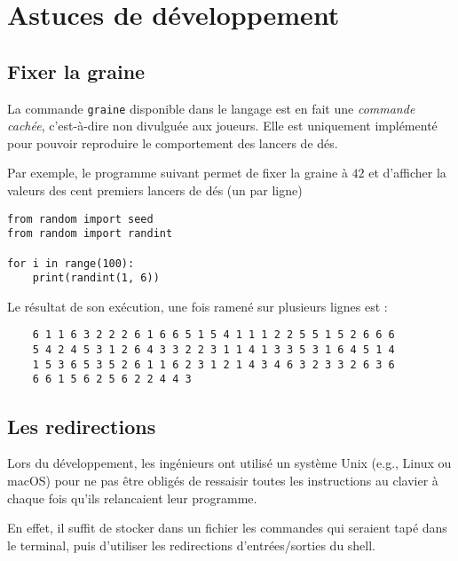 \documentclass{article}
\begin{document}
\section{Astuces de développement}

\subsection{Fixer la graine}

La commande {\tt graine} disponible dans le langage est en fait une \emph{commande cachée},
c'est-à-dire non divulguée aux joueurs. Elle est uniquement implémenté pour pouvoir reproduire
le comportement des lancers de dés.

\medskip

Par exemple, le programme suivant permet de fixer la graine à $42$ et d'afficher la valeurs
des cent premiers lancers de dés (un par ligne)

\begin{verbatim}
from random import seed
from random import randint

for i in range(100):
    print(randint(1, 6))
\end{verbatim}
Le résultat de son exécution, une fois ramené sur plusieurs lignes est :
\begin{center}
	\begin{verbatim}
	6 1 1 6 3 2 2 2 6 1 6 6 5 1 5 4 1 1 1 2 2 5 5 1 5 2 6 6 6
	5 4 2 4 5 3 1 2 6 4 3 3 2 2 3 1 1 4 1 3 3 5 3 1 6 4 5 1 4
	1 5 3 6 5 3 5 2 6 1 1 6 2 3 1 2 1 4 3 4 6 3 2 3 3 2 6 3 6
	6 6 1 5 6 2 5 6 2 2 4 4 3
	\end{verbatim}
\end{center}

\subsection{Les redirections}

Lors du développement, les ingénieurs ont utilisé un système Unix (e.g., Linux ou macOS)
pour ne pas être obligés de ressaisir toutes les instructions au clavier à chaque fois
qu'ils relancaient leur programme.

En effet, il suffit de stocker dans un fichier les commandes qui seraient tapé dans le terminal,
puis d'utiliser les redirections d'entrées/sorties du shell.
\end{document}
